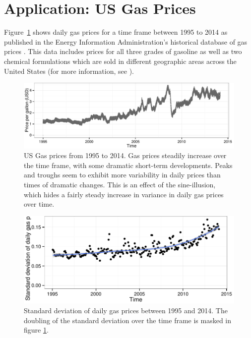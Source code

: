 \documentclass[11pt]{isuthesis}\usepackage[]{graphicx}\usepackage[]{color}
\newenvironment{knitrout}{}{} %
\begin{document}
\section{Application: US Gas Prices}
Figure~\ref{fig:gasprices} shows daily gas prices for a time frame between 1995 to 2014 as published in the Energy Information Administration's historical database of gas prices \citep{EIA}. This data includes prices for all three grades of gasoline as well as two chemical formulations which are sold in different geographic areas across the United States (for more information, see \citep{EIA-reformulated}). 

\begin{figure}[h!tbp]
\begin{knitrout}
\color{fgcolor}

{\centering \includegraphics[width=.98\linewidth]{Figure/sineIllusion/fig-gasprices-pictures-1} 

}



\end{knitrout}
\caption[US Gas prices from 1995 to 2014]{US Gas prices from 1995 to 2014. Gas prices steadily increase over the time frame, with some dramatic short-term developments. Peaks and troughs seem to exhibit more variability in daily prices than times of dramatic changes. This is an effect of the sine-illusion, which hides a fairly steady increase in variance in daily gas prices over time.}\label{fig:gasprices}
\end{figure}
\begin{figure}\centering
\begin{knitrout}
\color{fgcolor}

{\centering \includegraphics[width=.7\linewidth]{Figure/sineIllusion/fig-gaspricevariance-1} 

}



\end{knitrout}
\caption[Standard deviation of daily gas prices between 1995 and 2014. ]{Standard deviation of daily gas prices between 1995 and 2014. The doubling of the standard deviation over the time frame is masked in figure \ref{fig:gasprices}.\label{fig:gasvariance}}
\end{figure}
\end{document}
